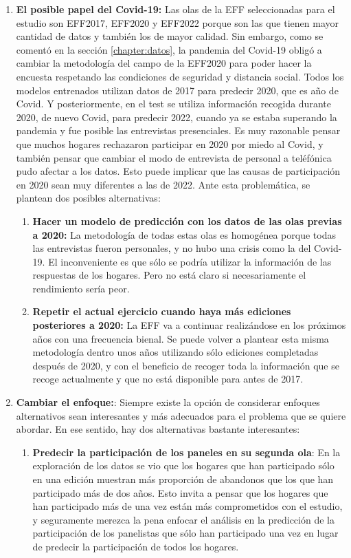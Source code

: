 \begin{enumerate}
    \item \textbf{El posible papel del Covid-19:} Las olas de la EFF seleccionadas para el estudio son EFF2017, EFF2020 y EFF2022 porque son las que tienen mayor cantidad de datos y también los de mayor calidad. Sin embargo, como se comentó en la sección \ref{chapter:datos}, la pandemia del Covid-19 obligó a cambiar la metodología del campo de la EFF2020 para poder hacer la encuesta respetando las condiciones de seguridad y distancia social. Todos los modelos entrenados utilizan datos de 2017 para predecir 2020, que es año de Covid. Y posteriormente, en el test se utiliza información recogida durante 2020, de nuevo Covid, para predecir 2022, cuando ya se estaba superando la pandemia y fue posible las entrevistas presenciales. Es muy razonable pensar que muchos hogares rechazaron participar en 2020 por miedo al Covid, y también pensar que cambiar el modo de entrevista de personal a teléfónica pudo afectar a los datos. Esto puede implicar que las causas de participación en 2020 sean muy diferentes a las de 2022. Ante esta problemática, se plantean dos posibles alternativas:
    \begin{enumerate}[noitemsep]
        \item \textbf{Hacer un modelo de predicción con los datos de las olas previas a 2020:} La metodología de todas estas olas es homogénea porque todas las entrevistas fueron personales, y no hubo una crisis como la del Covid-19. El inconveniente es que sólo se podría utilizar la información de las respuestas de los hogares. Pero no está claro si necesariamente el rendimiento sería peor.
        \item \textbf{Repetir el actual ejercicio cuando haya más ediciones posteriores a 2020:} La EFF va a continuar realizándose en los próximos años con una frecuencia bienal. Se puede volver a plantear esta misma metodología dentro unos años utilizando sólo ediciones completadas después de 2020, y con el beneficio de recoger toda la información que se recoge actualmente y que no está disponible para antes de 2017.
    \end{enumerate}
    \item\textbf{Cambiar el enfoque:}: Siempre existe la opción de considerar enfoques alternativos sean interesantes y más adecuados para el problema que se quiere abordar. En ese sentido, hay dos alternativas bastante interesantes:
    \begin{enumerate}[noitemsep]
        \item \textbf{Predecir la participación de los paneles en su segunda ola}: En la exploración de los datos se vio que los hogares que han participado sólo en una edición muestran más proporción de abandonos que los que han participado más de dos años. Esto invita a pensar que los hogares que han participado más de una vez están más comprometidos con el estudio, y seguramente merezca la pena enfocar el análisis en la predicción de la participación de los panelistas que sólo han participado una vez en lugar de predecir la participación de todos los hogares.

\end{enumerate}
\end{enumerate}
